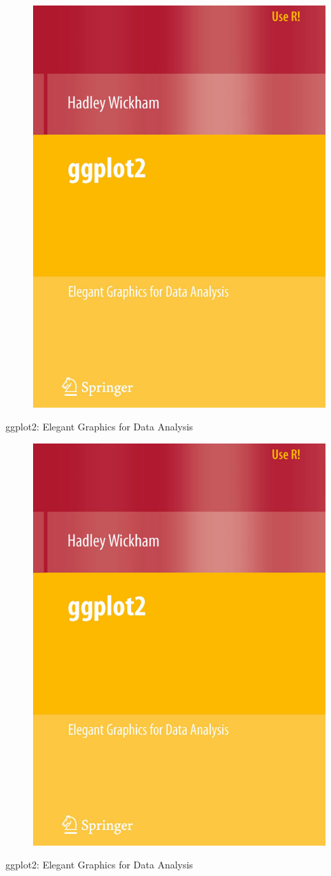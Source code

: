 \documentclass{beamer}
\begin{document}
\begin{frame}
	\begin{figure}
		\centering
		\includegraphics[width=0.55\linewidth]{ggplot2-bookcover}
	\end{figure}
	ggplot2: Elegant Graphics for Data Analysis
\end{frame}
\begin{frame}
\begin{figure}
\centering
\includegraphics[width=0.55\linewidth]{ggplot2-bookcover}
\end{figure}
ggplot2: Elegant Graphics for Data Analysis
\end{frame}
\end{document}
